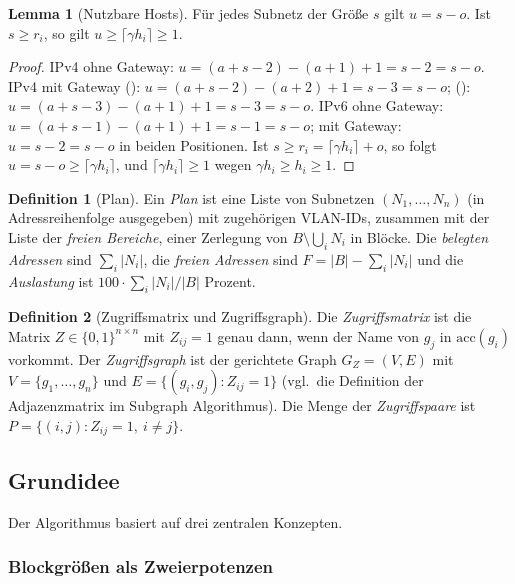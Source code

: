 \documentclass[a4paper,12pt]{article}
\theoremstyle{definition}
\newtheorem{definition}{Definition}
\newtheorem{lemma}{Lemma}
\newcommand{\code}[1]{\texttt{\detokenize{#1}}}
\begin{document}
\begin{lemma}[Nutzbare Hosts]
\label{lem:usable}
	Für jedes Subnetz der Größe $s$ gilt $u = s - o$. Ist $s \ge r_i$, so gilt $u \ge \lceil \gamma h_i \rceil \ge 1$.
\end{lemma}

\begin{proof}
	IPv4 ohne Gateway: $u = (a+s-2) - (a+1) + 1 = s - 2 = s - o$. IPv4 mit Gateway (\code{first}): $u = (a+s-2) - (a+2) + 1 = s-3 = s - o$; (\code{last}): $u = (a+s-3) - (a+1) + 1 = s - 3 = s-o$. IPv6 ohne Gateway: $u = (a+s-1) - (a+1) + 1 = s-1 = s-o$; mit Gateway: $u = s-2 = s-o$ in beiden Positionen. Ist $s \ge r_i = \lceil\gamma h_i\rceil + o$, so folgt $u = s - o \ge \lceil\gamma h_i\rceil$, und $\lceil \gamma h_i \rceil \ge 1$ wegen $\gamma h_i \ge h_i \ge 1$.
\end{proof}

\begin{definition}[Plan]
	Ein \emph{Plan} ist eine Liste von Subnetzen $(N_1,\ldots,N_n)$ (in Adressreihenfolge ausgegeben) mit zugehörigen VLAN-IDs, zusammen mit der Liste der \emph{freien Bereiche}, einer Zerlegung von $B \setminus \bigcup_i N_i$ in Blöcke. Die \emph{belegten Adressen} sind $\sum_i |N_i|$, die \emph{freien Adressen} sind $F = |B| - \sum_i |N_i|$ und die \emph{Auslastung} ist $100 \cdot \sum_i |N_i| / |B|$ Prozent.
\end{definition}

\begin{definition}[Zugriffsmatrix und Zugriffsgraph]
\label{def:zugriff}
	Die \emph{Zugriffsmatrix} ist die Matrix $Z \in \{0,1\}^{n\times n}$ mit $Z_{ij} = 1$ genau dann, wenn der Name von $g_j$ in $\text{acc}(g_i)$ vorkommt. Der \emph{Zugriffsgraph} ist der gerichtete Graph $G_Z = (V,E)$ mit $V = \{g_1,\ldots,g_n\}$ und $E = \{(g_i,g_j) : Z_{ij} = 1\}$ (vgl.\ die Definition der Adjazenzmatrix im Subgraph Algorithmus). Die Menge der \emph{Zugriffspaare} ist $P = \{(i,j) : Z_{ij} = 1,\ i \neq j\}$.
\end{definition}

\subsection{Grundidee}

Der Algorithmus basiert auf drei zentralen Konzepten.

\subsubsection{Blockgrößen als Zweierpotenzen}
\end{document}
